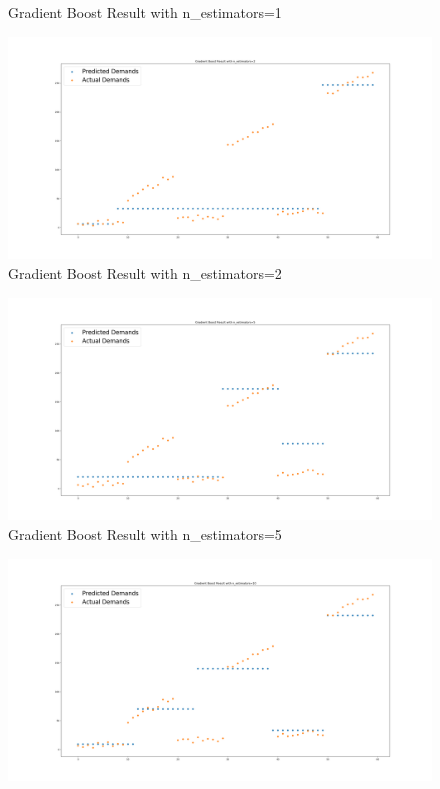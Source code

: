 \documentclass[a4paper]{article}
\begin{document}
\begin{enumerate}[(a)]
\begin{figure}[H]
            \caption{Gradient Boost Result with n\_estimators=1}
        \end{figure}
        \begin{figure}[H]
            \centering
            \includegraphics[scale=0.25]{P1c2.png}
            \caption{Gradient Boost Result with n\_estimators=2}
        \end{figure}
        \begin{figure}[H]
            \centering
            \includegraphics[scale=0.25]{P1c3.png}
            \caption{Gradient Boost Result with n\_estimators=5}
        \end{figure}
        \begin{figure}[H]
            \centering
            \includegraphics[scale=0.25]{P1c4.png}

\end{figure}
\end{enumerate}
\end{document}

